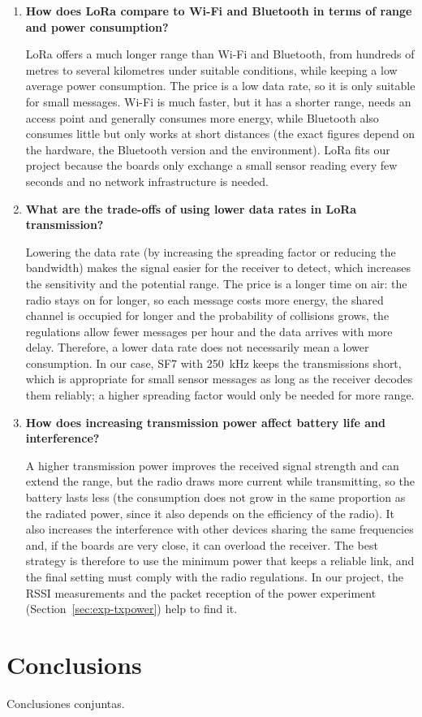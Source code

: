 \documentclass[informe,english]{plantilla}
\newcommand{\tcmp}[1]{\textlangle #1\textrangle}
\begin{document}
\begin{enumerate}[label=\textbf{Q\arabic*.}, leftmargin=*]
    \item \textbf{How does LoRa compare to Wi-Fi and Bluetooth in terms of range and power consumption?}

    LoRa offers a much longer range than Wi-Fi and Bluetooth, from hundreds of metres to several kilometres under suitable conditions, while keeping a low average power consumption. The price is a low data rate, so it is only suitable for small messages. Wi-Fi is much faster, but it has a shorter range, needs an access point and generally consumes more energy, while Bluetooth also consumes little but only works at short distances (the exact figures depend on the hardware, the Bluetooth version and the environment). LoRa fits our project because the boards only exchange a small sensor reading every few seconds and no network infrastructure is needed.

    \item \textbf{What are the trade-offs of using lower data rates in LoRa transmission?}

    Lowering the data rate (by increasing the spreading factor or reducing the bandwidth) makes the signal easier for the receiver to detect, which increases the sensitivity and the potential range. The price is a longer time on air: the radio stays on for longer, so each message costs more energy, the shared channel is occupied for longer and the probability of collisions grows, the regulations allow fewer messages per hour and the data arrives with more delay. Therefore, a lower data rate does not necessarily mean a lower consumption. In our case, SF7 with 250~kHz keeps the transmissions short, which is appropriate for small sensor messages as long as the receiver decodes them reliably; a higher spreading factor would only be needed for more range.

    \item \textbf{How does increasing transmission power affect battery life and interference?}

    A higher transmission power improves the received signal strength and can extend the range, but the radio draws more current while transmitting, so the battery lasts less (the consumption does not grow in the same proportion as the radiated power, since it also depends on the efficiency of the radio). It also increases the interference with other devices sharing the same frequencies and, if the boards are very close, it can overload the receiver. The best strategy is therefore to use the minimum power that keeps a reliable link, and the final setting must comply with the radio regulations. In our project, the RSSI measurements and the packet reception of the power experiment (Section~\ref{sec:exp-txpower}) help to find it.
\end{enumerate}

\section{Conclusions}
\label{sec:conclusions}
\tcmp{Conclusiones conjuntas.}
\end{document}
